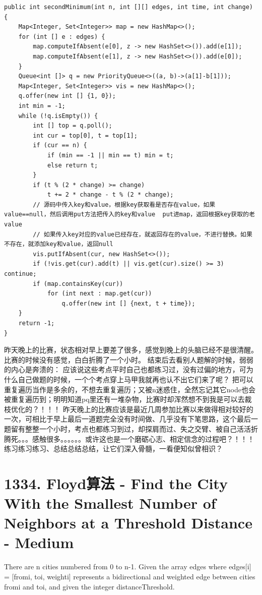 \documentclass[9pt, b5paaper]{book}
\begin{document}
\begin{verbatim}
public int secondMinimum(int n, int [][] edges, int time, int change) {
    Map<Integer, Set<Integer>> map = new HashMap<>();
    for (int [] e : edges) {
        map.computeIfAbsent(e[0], z -> new HashSet<>()).add(e[1]);
        map.computeIfAbsent(e[1], z -> new HashSet<>()).add(e[0]);
    }
    Queue<int []> q = new PriorityQueue<>((a, b)->(a[1]-b[1]));
    Map<Integer, Set<Integer>> vis = new HashMap<>();
    q.offer(new int [] {1, 0});
    int min = -1;
    while (!q.isEmpty()) {
        int [] top = q.poll();
        int cur = top[0], t = top[1];
        if (cur == n) {
            if (min == -1 || min == t) min = t;
            else return t;
        }
        if (t % (2 * change) >= change)
            t += 2 * change - t % (2 * change);
        // 源码中传入key和value，根据key获取看是否存在value，如果value==null，然后调用put方法把传入的key和value  put进map，返回根据key获取的老value
        // 如果传入key对应的value已经存在，就返回存在的value，不进行替换。如果不存在，就添加key和value，返回null
        vis.putIfAbsent(cur, new HashSet<>());
        if (!vis.get(cur).add(t) || vis.get(cur).size() >= 3) continue;
        if (map.containsKey(cur))
            for (int next : map.get(cur)) 
                q.offer(new int [] {next, t + time});
    }
    return -1;
}
\end{verbatim}
昨天晚上的比赛，状态相对早上要差了很多，感觉到晚上的头脑已经不是很清醒。比赛的时候没有感觉，白白折腾了一个小时。
结束后去看别人题解的时候，弱弱的内心是奔溃的：
应该说这些考点平时自己也都练习过，没有过偏的地方，可为什么自己做题的时候，一个个考点穿上马甲我就再也认不出它们来了呢？
把可以重复遍历当作是多余的，不想去重复遍历；又被n迷惑住，全然忘记其它node也会被重复遍历到；明明知道pq里还有一堆杂物，比赛时却浑然想不到我是可以去裁枝优化的？！！！
昨天晚上的比赛应该是最近几周参加比赛以来做得相对较好的一次，可相比于早上最后一道题完全没有时间做、几乎没有下笔思路，这个最后一题留有整整一个小时，考点也都练习到过，却探肩而过、失之交臂、被自己活活折腾死。。。感触很多。。。。。。或许这也是一个磨砺心志、相定信念的过程吧？！！！练习练习练习、总结总结总结，让它们深入骨髓，一看便知似曾相识？

\section{1334. Floyd算法 - Find the City With the Smallest Number of Neighbors at a Threshold Distance - Medium}
\label{sec-18-2}
There are n cities numbered from 0 to n-1. Given the array edges where edges[i] = [fromi, toi, weighti] represents a bidirectional and weighted edge between cities fromi and toi, and given the integer distanceThreshold.
\end{document}
